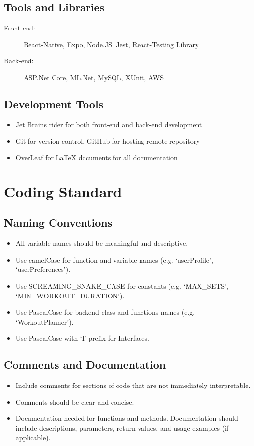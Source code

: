 \documentclass{article}
\begin{document}
	\subsection{Tools and Libraries}
	\begin{description}
		\item[Front-end:] React-Native, Expo, Node.JS, Jest, React-Testing Library
		\item[Back-end:] ASP.Net Core, ML.Net, MySQL, XUnit, AWS
	\end{description}

	\subsection{Development Tools}
	\begin{itemize}
		\item Jet Brains rider for both front-end and back-end development
		\item Git for version control, GitHub for hosting remote repository
		\item OverLeaf for LaTeX documents for all documentation
	\end{itemize}

	\section{Coding Standard}

	\subsection{Naming Conventions}
	\begin{itemize}
		\item All variable names should be meaningful and descriptive.
		\item Use camelCase for function and variable names (e.g. ‘userProfile’, ‘userPreferences’).
		\item Use SCREAMING\_SNAKE\_CASE for constants (e.g. ‘MAX\_SETS’, ‘MIN\_WORKOUT\_DURATION’).
		\item Use PascalCase for backend class and functions names (e.g. ‘WorkoutPlanner’).
		\item Use PascalCase with ‘I’ prefix for Interfaces.
	\end{itemize}

	\subsection{Comments and Documentation}
	\begin{itemize}
		\item Include comments for sections of code that are not immediately interpretable.
		\item Comments should be clear and concise.
		\item Documentation needed for functions and methods. Documentation should include descriptions, parameters, return values, and usage examples (if applicable).
	\end{itemize}
\end{document}
